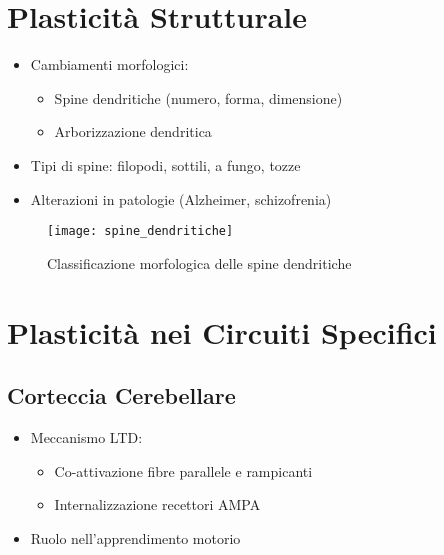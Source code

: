 \documentclass[12pt]{article}
\begin{document}
\section{Plasticità Strutturale}
\begin{itemize}
    \item Cambiamenti morfologici:
    \begin{itemize}
        \item Spine dendritiche (numero, forma, dimensione)
        \item Arborizzazione dendritica
    \end{itemize}
    \item Tipi di spine: filopodi, sottili, a fungo, tozze
    \item Alterazioni in patologie (Alzheimer, schizofrenia)
\end{itemize}

\begin{figure}[h]
    \centering
    \texttt{[image: spine\_dendritiche]}
    \caption{Classificazione morfologica delle spine dendritiche}
\end{figure}

\section{Plasticità nei Circuiti Specifici}
\subsection{Corteccia Cerebellare}
\begin{itemize}
    \item Meccanismo LTD: 
    \begin{itemize}
        \item Co-attivazione fibre parallele e rampicanti
        \item Internalizzazione recettori AMPA
    \end{itemize}
    \item Ruolo nell'apprendimento motorio
\end{itemize}
\end{document}
